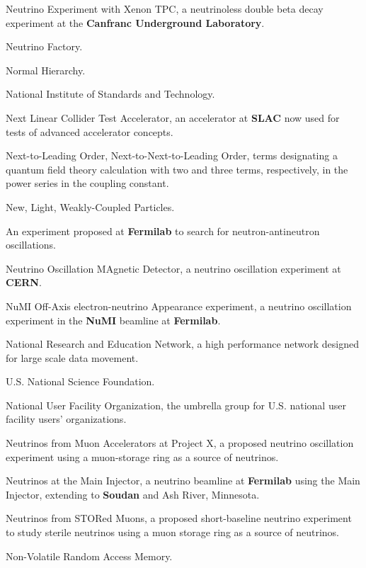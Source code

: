  Neutrino Experiment with Xenon TPC, a neutrinoless
double beta decay experiment at the {\bf Canfranc Underground Laboratory}.

 Neutrino Factory.

 Normal Hierarchy.

 National Institute of Standards and Technology.

  Next Linear Collider Test Accelerator, an
accelerator
at {\bf SLAC} now used for tests of advanced accelerator concepts.

 Next-to-Leading Order, Next-to-Next-to-Leading 
Order, terms designating a quantum field theory calculation with two and
three terms, respectively, in the power series in the coupling constant.

  New, Light, Weakly-Coupled Particles.


   An experiment proposed at {\bf Fermilab} to
search
 for neutron-antineutron oscillations.

 Neutrino Oscillation MAgnetic Detector,  a
neutrino oscillation experiment at {\bf CERN}.

 NuMI Off-Axis electron-neutrino Appearance
experiment, a neutrino oscillation experiment in the {\bf NuMI}
beamline at {\bf Fermilab}.

  National Research and Education Network, a 
     high performance 
   network designed for large scale data movement.

 U.S. National Science Foundation.

  National User Facility Organization, the umbrella
group for 
U.S. national user facility users' organizations.

 Neutrinos from Muon Accelerators at Project X, a 
proposed neutrino oscillation experiment using a muon-storage ring as
a source of neutrinos.

 Neutrinos at the Main Injector, a neutrino beamline at
{\bf Fermilab} using the Main Injector, extending to {\bf Soudan} and Ash River, Minnesota.

 Neutrinos from STORed Muons, a proposed
short-baseline neutrino experiment to study sterile neutrinos using
a muon storage ring as a source of neutrinos.

  Non-Volatile Random Access Memory.

